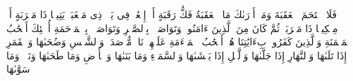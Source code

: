فَلَا ٱقۡتَحَمَ ٱلۡعَقَبَةَ%
\stopbuffer
\startbuffer[\q:90:12]
وَمَاۤ أَدۡرَىٰكَ مَا ٱلۡعَقَبَةُ%
\stopbuffer
\startbuffer[\q:90:13]
فَكُّ رَقَبَةٍ%
\stopbuffer
\startbuffer[\q:90:14]
أَوۡ إِطۡعَٰمࣱ فِی یَوۡمࣲ ذِی مَسۡغَبَةࣲ%
\stopbuffer
\startbuffer[\q:90:15]
یَتِیمࣰا ذَا مَقۡرَبَةٍ%
\stopbuffer
\startbuffer[\q:90:16]
أَوۡ مِسۡكِینࣰا ذَا مَتۡرَبَةࣲ%
\stopbuffer
\startbuffer[\q:90:17]
ثُمَّ كَانَ مِنَ ٱلَّذِینَ ءَامَنُوا۟ وَتَوَاصَوۡا۟ بِٱلصَّبۡرِ وَتَوَاصَوۡا۟ بِٱلۡمَرۡحَمَةِ%
\stopbuffer
\startbuffer[\q:90:18]
أُو۟لَٰۤئِكَ أَصۡحَٰبُ ٱلۡمَیۡمَنَةِ%
\stopbuffer
\startbuffer[\q:90:19]
وَٱلَّذِینَ كَفَرُوا۟ بِءَایَٰتِنَا هُمۡ أَصۡحَٰبُ ٱلۡمَشۡءَمَةِ%
\stopbuffer
\startbuffer[\q:90:20]
عَلَیۡهِمۡ نَارࣱ مُّؤۡصَدَةُۢ%
\stopbuffer
\startbuffer[\q:91:1]
وَٱلشَّمۡسِ وَضُحَىٰهَا%
\stopbuffer
\startbuffer[\q:91:2]
وَٱلۡقَمَرِ إِذَا تَلَىٰهَا%
\stopbuffer
\startbuffer[\q:91:3]
وَٱلنَّهَارِ إِذَا جَلَّىٰهَا%
\stopbuffer
\startbuffer[\q:91:4]
وَٱلَّیۡلِ إِذَا یَغۡشَىٰهَا%
\stopbuffer
\startbuffer[\q:91:5]
وَٱلسَّمَاۤءِ وَمَا بَنَىٰهَا%
\stopbuffer
\startbuffer[\q:91:6]
وَٱلۡأَرۡضِ وَمَا طَحَىٰهَا%
\stopbuffer
\startbuffer[\q:91:7]
وَنَفۡسࣲ وَمَا سَوَّىٰهَا%
\stopbuffer
